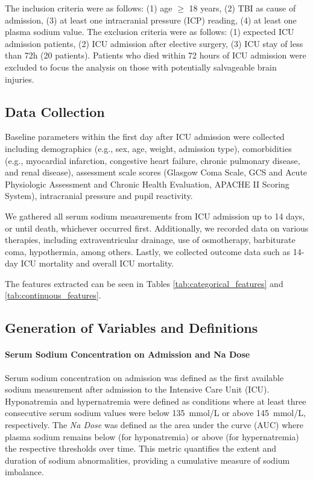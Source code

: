 The inclusion criteria were as follows: (1) age $\geq$ 18 years, (2) TBI as cause of admission, (3) at least one intracranial pressure (ICP) reading, (4) at least one plasma sodium value.
The exclusion criteria were as follows: (1) expected ICU admission patients, (2) ICU admission after elective surgery, (3) ICU stay of less than 72h (20 patients). Patients who died within 72 hours of ICU admission were excluded to focus the analysis on those with potentially salvageable brain injuries.

\subsection{Data Collection}
Baseline parameters within the first day after ICU admission were collected including demographics (e.g., sex, age, weight, admission type), comorbidities (e.g., myocardial infarction, congestive heart failure, chronic pulmonary disease, and renal disease), assessment scale scores (Glasgow Coma Scale, GCS and Acute Physiologic Assessment and Chronic Health Evaluation, APACHE II Scoring System), intracranial pressure and pupil reactivity.

We gathered all serum sodium measurements from ICU admission up to 14 days, or until death, whichever occurred first. Additionally, we recorded data on various therapies, including extraventricular drainage, use of osmotherapy, barbiturate coma, hypothermia, among others. Lastly, we collected outcome data such as 14-day ICU mortality and overall ICU mortality.

The features extracted can be seen in Tables \ref{tab:categorical_features} and \ref{tab:continuous_features}.

\subsection{Generation of Variables and Definitions}

\paragraph{Serum Sodium Concentration on Admission and Na Dose}

Serum sodium concentration on admission was defined as the first available sodium measurement after admission to the Intensive Care Unit (ICU). Hyponatremia and hypernatremia were defined as conditions where at least three consecutive serum sodium values were below 135~mmol/L or above 145~mmol/L, respectively. The \textit{Na Dose} was defined as the area under the curve (AUC) where plasma sodium remains below (for hyponatremia) or above (for hypernatremia) the respective thresholds over time. This metric quantifies the extent and duration of sodium abnormalities, providing a cumulative measure of sodium imbalance.

